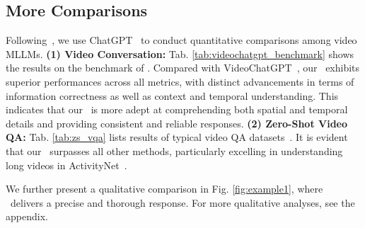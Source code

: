 \subsection{More Comparisons}
Following~\cite{videochatgpt},
we use ChatGPT~\cite{chatgpt} to conduct quantitative comparisons among video MLLMs.
\textbf{(1) Video Conversation:}
Tab. \ref{tab:videochatgpt_benchmark} shows the results on the benchmark of \cite{videochatgpt}.
Compared with VideoChatGPT~\cite{videochatgpt},
our \ModelName\  exhibits superior performances across all metrics,
with distinct advancements in terms of information correctness as well as context and temporal understanding.
This indicates that our \ModelName\ is more adept at comprehending both spatial and temporal details
and providing consistent and reliable responses.
\textbf{(2) Zero-Shot Video QA:}
Tab. \ref{tab:zs_vqa} lists results of typical video QA datasets~\cite{msrvtt_qa,activitynet_qa}.
It is evident that our \ModelName\  surpasses all other methods,
particularly excelling in understanding long videos in ActivityNet~\cite{activitynet_qa}.

We further present a qualitative comparison in Fig. \ref{fig:example1},
where \ModelName\ delivers a precise and thorough response. 
For more qualitative analyses,
see the appendix.

